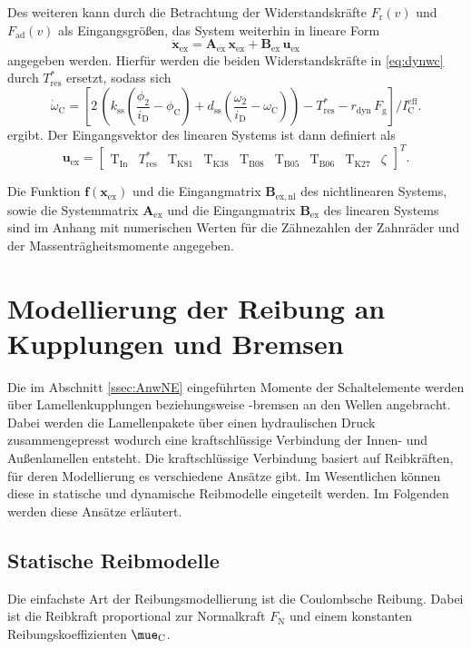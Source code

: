 Des weiteren kann durch die Betrachtung der Widerstandskräfte $F_\mathrm{r}(v)$ und $F_\mathrm{ad}(v)$ als Eingangsgrößen, das System weiterhin in lineare Form
\begin{equation}
\dot{\pmb{x}}_\mathrm{ex} = \pmb{A}_\mathrm{ex}\,\pmb{x}_\mathrm{ex} + \pmb{B}_\mathrm{ex}\,\pmb{u}_\mathrm{ex}
\end{equation}
angegeben werden. Hierfür werden die beiden Widerstandskräfte in \eqref{eq:dynwc} durch $T^*_\mathrm{res}$ ersetzt, sodass sich 
\begin{equation}\label{eq:dynwc_lin}
\dot{\omega}_\mathrm{C} = \left[ 2\,\left(k_\mathrm{ss}\left(\frac{\phi_2}{i_{\mathrm{D}}} - \phi_\mathrm{C}\right) + d_\mathrm{ss}\left(\frac{\omega_2}{i_{\mathrm{D}}} - \omega_\mathrm{C}\right)\right) - T^*_\mathrm{res} - r_\mathrm{dyn}\, F_\mathrm{g}\right]/I^\mathrm{eff}_\mathrm{C}.
\end{equation}
 ergibt. Der Eingangsvektor des linearen Systems ist dann definiert als 
\begin{equation}\label{eq:uex}
\pmb{u}_\mathrm{ex} = \begin{bmatrix} \mathrm{T}_{\mathrm{In}} & T^*_\mathrm{res} & \mathrm{T}_{\mathrm{K81}} & \mathrm{T}_{\mathrm{K38}} & \mathrm{T}_{\mathrm{B08}} & \mathrm{T}_{\mathrm{B05}} & \mathrm{T}_{\mathrm{B06}} & \mathrm{T}_{\mathrm{K27}} & \zeta \end{bmatrix}^T.
\end{equation}

Die Funktion $\pmb{f}(\pmb{x}_\mathrm{ex})$ und die Eingangmatrix $\pmb{B}_\mathrm{ex,nl}$ des nichtlinearen Systems, sowie die Systemmatrix $\pmb{A}_\mathrm{ex}$ und die Eingangmatrix $\pmb{B}_\mathrm{ex}$ des linearen Systems sind im Anhang mit numerischen Werten für die Zähnezahlen der Zahnräder und der Massenträgheitsmomente angegeben.

\section{Modellierung der Reibung an Kupplungen und Bremsen}
Die im Abschnitt \ref{ssec:AnwNE} eingeführten Momente der Schaltelemente werden über Lamellenkupplungen beziehungsweise -bremsen an den Wellen angebracht. Dabei werden die Lamellenpakete über einen hydraulischen Druck zusammengepresst wodurch eine kraftschlüssige Verbindung der Innen- und Außenlamellen entsteht. Die kraftschlüssige Verbindung basiert auf Reibkräften, für deren Modellierung es verschiedene Ansätze gibt. Im Wesentlichen können diese in statische und dynamische Reibmodelle eingeteilt werden. Im Folgenden werden diese Ansätze erläutert.

\subsection{Statische Reibmodelle}
Die einfachste Art der Reibungsmodellierung ist die Coulombsche Reibung. Dabei ist die Reibkraft proportional zur Normalkraft $F_\mathrm{N}$ und einem konstanten Reibungskoeffizienten $\mue_\mathrm{C}$. 